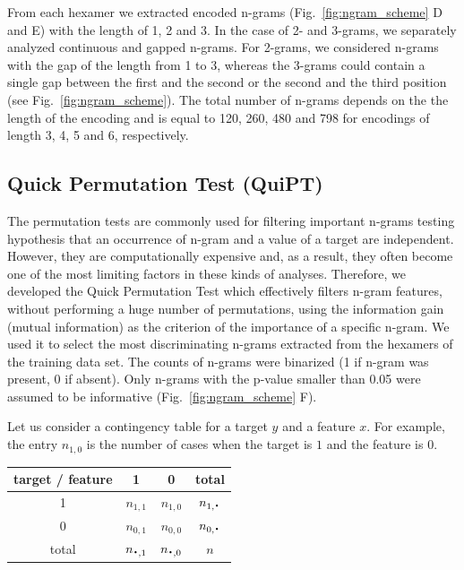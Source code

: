 \documentclass[fleqn,10pt,twoside]{gcb15submission}
\newcommand*{\bigcdot}{\raisebox{-0.25ex}{\scalebox{1.5}{$\cdot$}}}
\begin{document}
  From each hexamer we extracted encoded n-grams (Fig.~\ref{fig:ngram_scheme} D 
and E) with the length of 1, 2 and 3. In the case of 2- and 3-grams, we 
separately analyzed continuous and gapped n-grams. For 2-grams, we considered 
n-grams with the gap of the length from 1 to 3, whereas the 3-grams could 
contain a single gap between the first and the second or the second and the 
third position (see Fig.~\ref{fig:ngram_scheme}). The total number of n-grams 
depends on the the length of the encoding and is equal to 120, 260, 480 and 798 
for encodings of length 3, 4, 5 and 6, respectively.


\subsection{Quick Permutation Test (QuiPT)}

The permutation tests are commonly used for filtering important n-grams 
testing hypothesis that an occurrence of n-gram and a value of a target are 
independent. However, they are computationally expensive and, as a result, they 
often become one of the most limiting factors in these kinds of analyses. 
Therefore, we developed the Quick Permutation Test which effectively filters 
n-gram features, without performing a huge number of permutations, using the 
information gain (mutual information) as the criterion of the importance of a 
specific n-gram. We used it to select the most discriminating n-grams extracted 
from the hexamers of the training data set. The counts of n-grams were binarized 
(1 if n-gram was present, 0 if absent). Only n-grams with the p-value smaller 
than 0.05 were assumed to be informative (Fig.~\ref{fig:ngram_scheme} F). 

  Let us consider a contingency table for a target $y$ and 
a feature $x$. For example, the entry $n_{1,0}$ is the number of cases when the 
target is $1$ and the feature is $0$.

\begin{center}
\small
\begin{tabular}{ | c || c | c | c | }
%
%
  \hline			
  target / feature & 1 & 0 & total\\ \hline
 1 & $n_{1,1}$ & $n_{1,0}$ & $n_{1,\bigcdot}$ \\
 0 & $n_{0,1}$ & $n_{0,0}$ & $n_{0,\bigcdot}$ \\ \hline
 total & $n_{\bigcdot,1}$ & $n_{\bigcdot,0}$ & $n$ \\
  \hline  
\end{tabular} 
\end{center}
\end{document}
